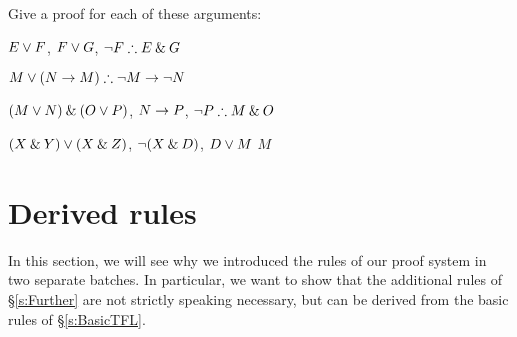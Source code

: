 \problempart 
Give a proof for each of these arguments:
\begin{earg}
\item $E\vee F$, $F\vee G$, $\enot F \therefore E \eand G$
\item $M\eor(N\eif M) \therefore \enot M \eif \enot N$
\item $(M \vee N) \mathbin{\&} (O \vee P)$, $N \rightarrow P$, $\enot P \therefore M\eand O$
\item $(X\mathbin{\&} Y)\vee(X\mathbin{\&} Z)$, $\neg(X\mathbin{\&} D)$, $D\vee M$ \therefore $M$
\end{earg}





\chapter{Derived rules}\label{s:Derived}

In this section, we will see why we introduced the rules of our proof system in two separate batches. In particular, we want to show that the additional rules of \S\ref{s:Further} are not strictly speaking necessary, but can be derived from the basic rules of \S\ref{s:BasicTFL}.
 
%


